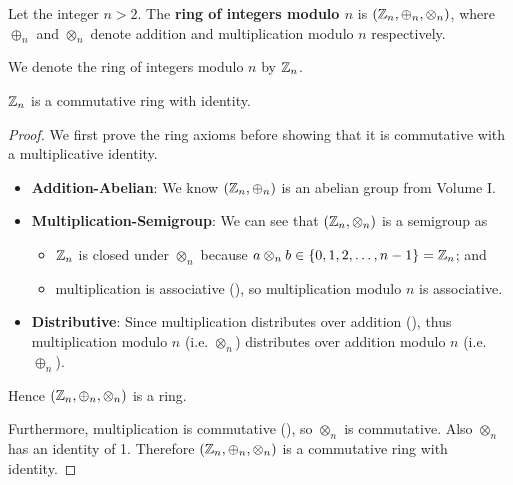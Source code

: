 \begin{definition}
    Let the integer $n > 2$. The \textbf{ring of integers modulo $n$} is $(\mathbb{Z}_n, \oplus_n, \otimes_n)$, where $\oplus_n$ and $\otimes_n$ denote addition and multiplication modulo $n$ respectively.
\end{definition}
\begin{remark}
    We denote the ring of integers modulo $n$ by $\mathbb{Z}_n$.
\end{remark}
\begin{proposition}
    $\mathbb{Z}_n$ is a commutative ring with identity.
\end{proposition}
\begin{proof}
    We first prove the ring axioms before showing that it is commutative with a multiplicative identity.
    \begin{itemize}
        \item \textbf{Addition-Abelian}: We know $(\mathbb{Z}_n, \oplus_n)$ is an abelian group from Volume I.
        \item \textbf{Multiplication-Semigroup}: We can see that $(\mathbb{Z}_n, \otimes_n)$ is a semigroup as
        \begin{itemize}
            \item $\mathbb{Z}_n$ is closed under $\otimes_n$ because $a \otimes_n b \in \{0, 1, 2, \dots, n-1\} = \mathbb{Z}_n$; and
            \item multiplication is associative (), so multiplication modulo $n$ is associative.
        \end{itemize}
        \item \textbf{Distributive}: Since multiplication distributes over addition (), thus multiplication modulo $n$ (i.e. $\otimes_n$) distributes over addition modulo $n$ (i.e. $\oplus_n$).
    \end{itemize}
    Hence $(\mathbb{Z}_n, \oplus_n, \otimes_n)$ is a ring.
    
    Furthermore, multiplication is commutative (), so $\otimes_n$ is commutative. Also $\otimes_n$ has an identity of 1. Therefore $(\mathbb{Z}_n, \oplus_n, \otimes_n)$ is a commutative ring with identity.
\end{proof}

